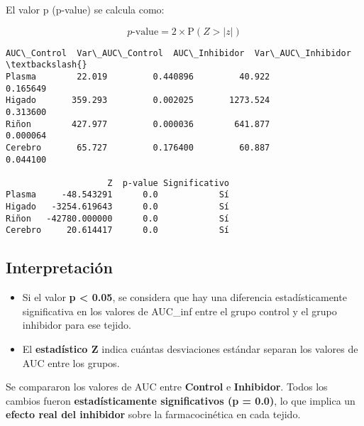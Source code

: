 \documentclass[11pt]{article}
\providecommand{\tightlist}{%
      \setlength{\itemsep}{0pt}\setlength{\parskip}{0pt}}
\begin{document}
El valor p (p-value) se calcula como:

\[
p\text{-value} = 2 \times \text{P}(Z > |z|)
\]

    \begin{Verbatim}[commandchars=\\\{\}]
         AUC\_Control  Var\_AUC\_Control  AUC\_Inhibidor  Var\_AUC\_Inhibidor  \textbackslash{}
Plasma        22.019         0.440896         40.922           0.165649
Higado       359.293         0.002025       1273.524           0.313600
Riñon        427.977         0.000036        641.877           0.000064
Cerebro       65.727         0.176400         60.887           0.044100

                    Z  p-value Significativo
Plasma     -48.543291      0.0            Sí
Higado   -3254.619643      0.0            Sí
Riñon   -42780.000000      0.0            Sí
Cerebro     20.614417      0.0            Sí
    \end{Verbatim}

    \subsection{Interpretación}\label{interpretaciuxf3n}

\begin{itemize}
\tightlist
\item
  Si el valor \textbf{p \textless{} 0.05}, se considera que hay una
  diferencia estadísticamente significativa en los valores de AUC\_inf
  entre el grupo control y el grupo inhibidor para ese tejido.
\item
  El \textbf{estadístico Z} indica cuántas desviaciones estándar separan
  los valores de AUC entre los grupos.
\end{itemize}

Se compararon los valores de AUC entre \textbf{Control} e
\textbf{Inhibidor}. Todos los cambios fueron \textbf{estadísticamente
significativos (p = 0.0)}, lo que implica un \textbf{efecto real del
inhibidor} sobre la farmacocinética en cada tejido.
\end{document}
